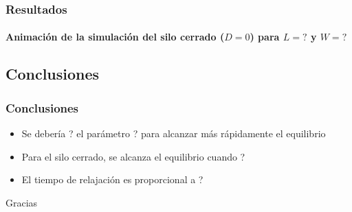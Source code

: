 \documentclass[hyperref={pdfpagelayout=SinglePage}]{beamer}
\begin{document}
\begin{frame}
\frametitle{Resultados}
\framesubtitle{Animación de la simulación del silo cerrado ($D = 0$) para $L = ?$ y $W = ?$}
\begin{figure}[H]
	\centering
\end{figure}
\end{frame}

\subsection{Conclusiones}

\begin{frame}
\frametitle{Conclusiones}
\begin{itemize}
	\item Se debería ? el parámetro ? para alcanzar más rápidamente el equilibrio
	\item Para el silo cerrado, se alcanza el equilibrio cuando ?
	\item El tiempo de relajación es proporcional a ?
\end{itemize}	
\end{frame} 

\begin{frame}[plain]
    \centering
	\Huge Gracias
\end{frame}
\end{document}
